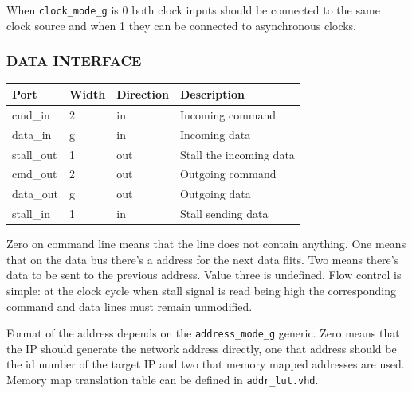 \documentclass[a4paper,10pt,oneside,final]{article}
\def\deftablecolora{blue!10!white}
\def\deftablecolorb{white}
\begin{document}
When \texttt{clock\_mode\_g} is 0 both clock inputs should be
connected to the same clock source and when 1 they can be connected to
asynchronous clocks.

\subsubsection{DATA INTERFACE}

\begin{center}
  \rowcolors{3}{\deftablecolora}{\deftablecolorb}

  \begin{tabularx}{\textwidth}{|lllX|}
    \hline
    Port   & Width & Direction & Description\\
    \hline
    cmd\_in    & 2 & in  & Incoming command\\
    data\_in   & g & in  & Incoming data\\
    stall\_out & 1 & out & Stall the incoming data\\
    cmd\_out   & 2 & out & Outgoing command\\
    data\_out  & g & out & Outgoing data\\
    stall\_in  & 1 & in  & Stall sending data\\
    \hline
  \end{tabularx}
\end{center}

Zero on command line means that the line does not contain
anything. One means that on the data bus there's a address for the
next data flits. Two means there's data to be sent to the previous address.
Value three is undefined. Flow control is simple: at the clock cycle
when stall signal is read being high the corresponding command and
data lines must remain unmodified.

Format of the address depends on the \texttt{address\_mode\_g}
generic. Zero means that the IP should generate the network address
directly, one that address should be the id number of the target IP
and two that memory mapped addresses are used. Memory map translation
table can be defined in \texttt{addr\_lut.vhd}.
\end{document}

